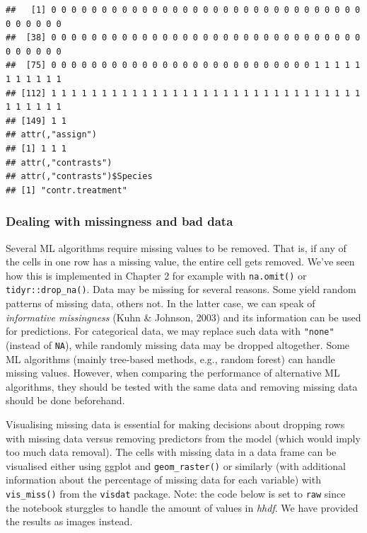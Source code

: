 \documentclass[
]{book}
\begin{document}
\begin{verbatim}
##   [1] 0 0 0 0 0 0 0 0 0 0 0 0 0 0 0 0 0 0 0 0 0 0 0 0 0 0 0 0 0 0 0 0 0 0 0 0 0
##  [38] 0 0 0 0 0 0 0 0 0 0 0 0 0 0 0 0 0 0 0 0 0 0 0 0 0 0 0 0 0 0 0 0 0 0 0 0 0
##  [75] 0 0 0 0 0 0 0 0 0 0 0 0 0 0 0 0 0 0 0 0 0 0 0 0 0 0 1 1 1 1 1 1 1 1 1 1 1
## [112] 1 1 1 1 1 1 1 1 1 1 1 1 1 1 1 1 1 1 1 1 1 1 1 1 1 1 1 1 1 1 1 1 1 1 1 1 1
## [149] 1 1
## attr(,"assign")
## [1] 1 1 1
## attr(,"contrasts")
## attr(,"contrasts")$Species
## [1] "contr.treatment"
\end{verbatim}

\hypertarget{dealing-with-missingness-and-bad-data}{%
\subsubsection{Dealing with missingness and bad data}\label{dealing-with-missingness-and-bad-data}}

Several ML algorithms require missing values to be removed. That is, if any of the cells in one row has a missing value, the entire cell gets removed. We've seen how this is implemented in Chapter 2 for example with \texttt{na.omit()} or \texttt{tidyr::drop\_na()}. Data may be missing for several reasons. Some yield random patterns of missing data, others not. In the latter case, we can speak of \emph{informative missingness} (Kuhn \& Johnson, 2003) and its information can be used for predictions. For categorical data, we may replace such data with \texttt{"none"} (instead of \texttt{NA}), while randomly missing data may be dropped altogether. Some ML algorithms (mainly tree-based methods, e.g., random forest) can handle missing values. However, when comparing the performance of alternative ML algorithms, they should be tested with the same data and removing missing data should be done beforehand.

Visualising missing data is essential for making decisions about dropping rows with missing data versus removing predictors from the model (which would imply too much data removal). The cells with missing data in a data frame can be visualised either using ggplot and \texttt{geom\_raster()} or similarly (with additional information about the percentage of missing data for each variable) with \texttt{vis\_miss()} from the \texttt{visdat} package.
Note: the code below is set to \texttt{raw} since the notebook sturggles to handle the amount of values in \emph{hhdf}. We have provided the results as images instead.
\end{document}

